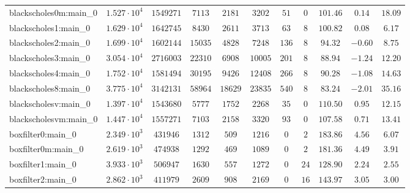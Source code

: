 \begin{tabular}{|l|c|c|c|c|c|c|c|c|c|c|}
blackscholes0m:main\_0         & $ 1.527 \cdot 10^{4} $ & $ 1549271  $ & $ 7113   $ & $ 2181   $ & $ 3202   $ & $ 51   $ & $ 0    $ & $ 101.46      $ & $ 0.14    $ & $ 18.09   $ \\
blackscholes1:main\_0          & $ 1.629 \cdot 10^{4} $ & $ 1642745  $ & $ 8430   $ & $ 2611   $ & $ 3713   $ & $ 63   $ & $ 8    $ & $ 100.82      $ & $ 0.08    $ & $ 6.17    $ \\
blackscholes2:main\_0          & $ 1.699 \cdot 10^{4} $ & $ 1602144  $ & $ 15035  $ & $ 4828   $ & $ 7248   $ & $ 136  $ & $ 8    $ & $ 94.32       $ & $ -0.60   $ & $ 8.75    $ \\
blackscholes3:main\_0          & $ 3.054 \cdot 10^{4} $ & $ 2716003  $ & $ 22310  $ & $ 6908   $ & $ 10005  $ & $ 201  $ & $ 8    $ & $ 88.94       $ & $ -1.24   $ & $ 12.20   $ \\
blackscholes4:main\_0          & $ 1.752 \cdot 10^{4} $ & $ 1581494  $ & $ 30195  $ & $ 9426   $ & $ 12408  $ & $ 266  $ & $ 8    $ & $ 90.28       $ & $ -1.08   $ & $ 14.63   $ \\
blackscholes8:main\_0          & $ 3.775 \cdot 10^{4} $ & $ 3142131  $ & $ 58964  $ & $ 18629  $ & $ 23835  $ & $ 540  $ & $ 8    $ & $ 83.24       $ & $ -2.01   $ & $ 35.16   $ \\
blackscholesv:main\_0          & $ 1.397 \cdot 10^{4} $ & $ 1543680  $ & $ 5777   $ & $ 1752   $ & $ 2268   $ & $ 35   $ & $ 0    $ & $ 110.50      $ & $ 0.95    $ & $ 12.15   $ \\
blackscholesvm:main\_0         & $ 1.447 \cdot 10^{4} $ & $ 1557271  $ & $ 7103   $ & $ 2158   $ & $ 3320   $ & $ 93   $ & $ 0    $ & $ 107.58      $ & $ 0.71    $ & $ 13.41   $ \\
boxfilter0:main\_0             & $ 2.349 \cdot 10^{3} $ & $ 431946   $ & $ 1312   $ & $ 509    $ & $ 1216   $ & $ 0    $ & $ 2    $ & $ 183.86      $ & $ 4.56    $ & $ 6.07    $ \\
boxfilter0m:main\_0            & $ 2.619 \cdot 10^{3} $ & $ 474938   $ & $ 1292   $ & $ 469    $ & $ 1089   $ & $ 0    $ & $ 2    $ & $ 181.36      $ & $ 4.49    $ & $ 3.91    $ \\
boxfilter1:main\_0             & $ 3.933 \cdot 10^{3} $ & $ 506947   $ & $ 1630   $ & $ 557    $ & $ 1272   $ & $ 0    $ & $ 24   $ & $ 128.90      $ & $ 2.24    $ & $ 2.55    $ \\
boxfilter2:main\_0             & $ 2.862 \cdot 10^{3} $ & $ 411979   $ & $ 2609   $ & $ 908    $ & $ 2169   $ & $ 0    $ & $ 16   $ & $ 143.97      $ & $ 3.05    $ & $ 3.00    $ \\

\end{tabular}
